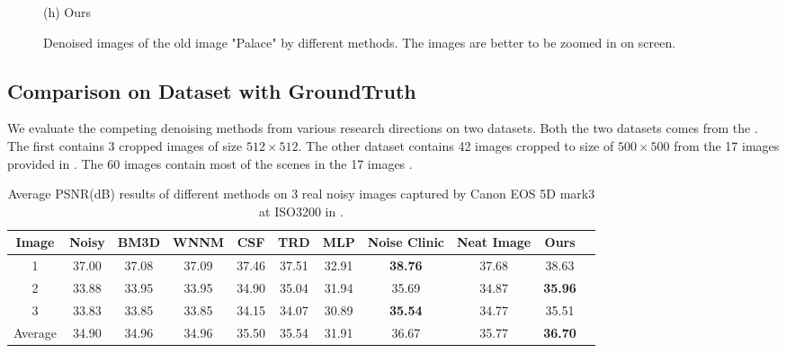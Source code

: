 \documentclass[10pt,twocolumn,letterpaper]{article}
\begin{document}
\begin{figure}
{\begin{minipage}[t]{0.244\textwidth}
{\footnotesize (h) Ours }
\end{minipage}
}
\caption{Denoised images of the old image "Palace" by different methods. The images are better to be zoomed in on screen.}
\label{fig2}
\end{figure}

\subsection{Comparison on Dataset with GroundTruth}
We evaluate the competing denoising methods from various research directions on two datasets. Both the two datasets comes from the \cite{crosschannel2016}. The first contains 3 cropped images of size $512\times512$. The other dataset contains 42 images cropped to size of $500\times500$ from the 17 images provided in \cite{crosschannel2016}. The 60 images contain most of the scenes in the 17 images \cite{crosschannel2016}.
\begin{table}
\caption{Average PSNR(dB) results of different methods on 3 real noisy images captured by Canon EOS 5D mark3 at ISO3200 in \cite{crosschannel2016}.}
\label{tab1}
\begin{center}
\renewcommand\arraystretch{1}
\begin{tabular}{|c||c|c|c|c|c|c|c|c|c|c|}
\hline
Image & \textbf{Noisy} &\textbf{BM3D}&\textbf{WNNM}&\textbf{CSF}&\textbf{TRD}&\textbf{MLP}& \textbf{Noise Clinic}& \textbf{Neat Image}&\textbf{Ours}
\\
\hline
1& 37.00 & 37.08 & 37.09 &  37.46  &  37.51  &  32.91  & \textbf{ 38.76}  & 37.68   & 38.63  
\\
\hline
2& 33.88 & 33.95  &  33.95  &  34.90  &  35.04  & 31.94   &  35.69  &  34.87  & \textbf{ 35.96 }
\\
\hline
3& 33.83  & 33.85  & 33.85   & 34.15   &   34.07 & 30.89   & \textbf{35.54 }  &  34.77  &  35.51 
\\
\hline
Average & 34.90  &  34.96 &  34.96  & 35.50   & 35.54   &  31.91  &  36.67  &  35.77  &  \textbf{ 36.70}
\\
\hline
\end{tabular}
\end{center}
\end{table}
\end{document}
